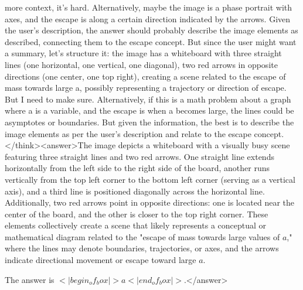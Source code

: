 more context, it's hard. Alternatively, maybe the image is a phase portrait with axes, and the escape is along a certain direction indicated by the arrows. Given the user's description, the answer should probably describe the image elements as described, connecting them to the escape concept. But since the user might want a summary, let's structure it: the image has a whiteboard with three straight lines (one horizontal, one vertical, one diagonal), two red arrows in opposite directions (one center, one top right), creating a scene related to the escape of mass towards large a, possibly representing a trajectory or direction of escape. But I need to make sure. Alternatively, if this is a math problem about a graph where a is a variable, and the escape is when a becomes large, the lines could be asymptotes or boundaries. But given the information, the best is to describe the image elements as per the user's description and relate to the escape concept.</think><answer>The image depicts a whiteboard with a visually busy scene featuring three straight lines and two red arrows. One straight line extends horizontally from the left side to the right side of the board, another runs vertically from the top left corner to the bottom left corner (serving as a vertical axis), and a third line is positioned diagonally across the horizontal line. Additionally, two red arrows point in opposite directions: one is located near the center of the board, and the other is closer to the top right corner. These elements collectively create a scene that likely represents a conceptual or mathematical diagram related to the "escape of mass towards large values of \(a\)," where the lines may denote boundaries, trajectories, or axes, and the arrows indicate directional movement or escape toward large \(a\).  

The answer is \(<|begin_of_box|>a<|end_of_box|>\).</answer>